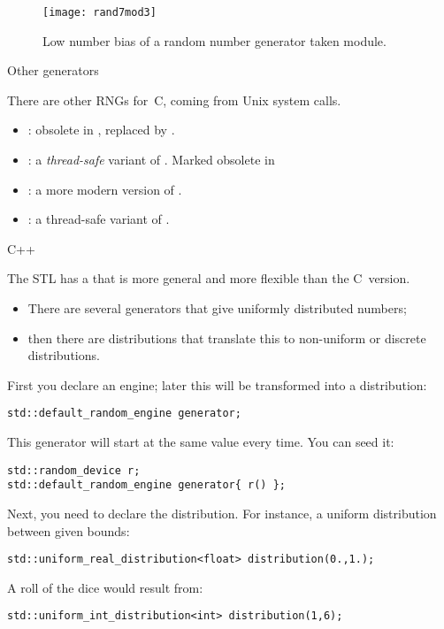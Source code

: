 \begin{figure}[t]
  \texttt{[image: rand7mod3]}
  \caption{Low number bias of a random number generator taken module.}
  \label{fig:rand7mod3}
\end{figure}

 {Other generators}

There are other \acp{RNG} for~C,
coming from Unix system calls.
\begin{itemize}
\item {}: obsolete in ,
  replaced by .
\item {}: a
  \emph{thread-safe}
  variant of .
  Marked obsolete in 
\item {}: a more modern version of .
\item {}: a thread-safe variant of .
\end{itemize}


 {C++}
\lstset{language=C++}

The \ac{STL} has a
that is more general and more flexible than the C~version.
\begin{itemize}
\item There are several generators that give uniformly distributed
  numbers;
\item then there are distributions that translate this to non-uniform
  or discrete distributions.
\end{itemize}

First you declare an engine; later this will be transformed into a distribution:
\begin{lstlisting}
std::default_random_engine generator;
\end{lstlisting}

This generator will start at the same value every time.
You can seed it:
\begin{lstlisting}
std::random_device r;
std::default_random_engine generator{ r() };
\end{lstlisting}

Next, you need to declare the distribution.
For instance, a uniform distribution between given bounds:
\begin{lstlisting}
std::uniform_real_distribution<float> distribution(0.,1.);
\end{lstlisting}
A roll of the dice would result from:
\begin{lstlisting}
std::uniform_int_distribution<int> distribution(1,6);
\end{lstlisting}

